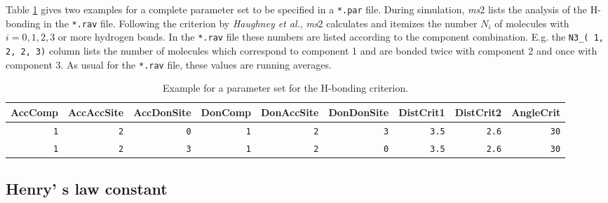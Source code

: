 Table \ref{tab:Hbonding} gives two examples for a complete parameter set to be specified in a \texttt{*.par} file. During simulation, \textit{ms}2 lists the analysis of the H-bonding in the \texttt{*.rav} file. Following the criterion by \textit{Haughney et al.}, \textit{ms}2 calculates and itemizes the number $N_i$ of molecules with $i=0,1,2,3$ or more hydrogen bonds. In the \texttt{*.rav} file these numbers are listed according to the component combination. E.g. the \texttt{N3\_( 1, 2, 2, 3)} column lists the number of molecules which correspond to component 1 and are bonded twice with component 2 and once with component 3. As usual for the \texttt{*.rav} file, these values are running averages. 

\begin{table}[h!]
	\centering
	\caption{Example for a parameter set for the H-bonding criterion.}
	\begin{tabular}{rrrrrrrrr}
		\toprule
		\footnotesize AccComp & \footnotesize AccAccSite & \footnotesize AccDonSite & \footnotesize DonComp & \footnotesize DonAccSite & \footnotesize DonDonSite & \footnotesize DistCrit1 & \footnotesize DistCrit2 & \footnotesize AngleCrit \\ 
		\midrule
		\texttt{1}     & \texttt{2}     & \texttt{0}     & \texttt{1}     & \texttt{2}     & \texttt{3}     & \texttt{3.5}   & \texttt{2.6}   & \texttt{30} \\
		\texttt{1}     & \texttt{2}     & \texttt{3}     & \texttt{1}     & \texttt{2}     & \texttt{0}     & \texttt{3.5}   & \texttt{2.6}   & \texttt{30} \\
		\bottomrule
	\end{tabular}%
	\label{tab:Hbonding}%
\end{table}%



\subsection{Henry' s law constant}
\label{sec:Henry' s law constant}


